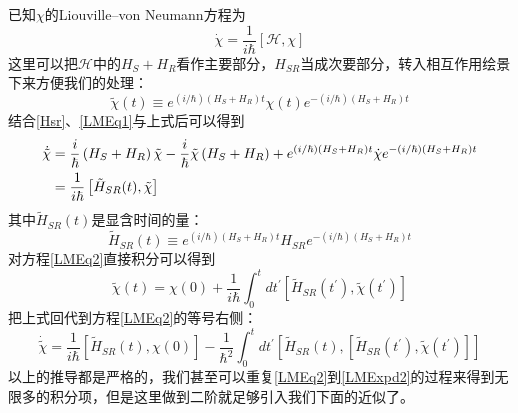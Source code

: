 已知$\chi$的Liouville--von Neumann方程为
\begin{equation}
\dot{\chi}=\frac{1}{i \hbar}[\mathcal{H}, \chi]
\label{LMEq1}
\end{equation}
这里可以把$\mathcal{H}$中的$H_{S}+H_{R}$看作主要部分，$H_{SR}$当成次要部分，转入相互作用绘景下来方便我们的处理：
\begin{equation}
\tilde{\chi}(t) \equiv e^{(i / \hbar)\left(H_{S}+H_{R}\right) t} \chi(t) e^{-(i / \hbar)\left(H_{S}+H_{R}\right) t}
\end{equation}
结合\eqref{Hsr}、\eqref{LMEq1}与上式后可以得到
\begin{align}
\dot{\tilde{\chi}} &=\frac{i}{\hbar}\left(H_{S}+H_{R}\right) \tilde{\chi}-\frac{i}{\hbar} \tilde{\chi}\left(H_{S}+H_{R}\right)+e^{(i / \hbar)\left(H_{S}+H_{R}\right) t} \dot{\chi} e^{-(i / \hbar)\left(H_{S}+H_{R}\right) t} \notag \\
&=\frac{1}{i \hbar}\left[\tilde{H}_{S R}(t), \tilde{\chi}\right]
\label{LMEq2}
\end{align}
其中$\tilde{H}_{S R}(t)$是显含时间的量：
\begin{equation}
\tilde{H}_{S R}(t) \equiv e^{(i / \hbar)\left(H_{S}+H_{R}\right) t} H_{S R} e^{-(i / \hbar)\left(H_{S}+H_{R}\right) t}
\end{equation}
对方程\eqref{LMEq2}直接积分可以得到
\begin{equation}
\tilde{\chi}(t)=\chi(0)+\frac{1}{i \hbar} \int_{0}^{t} d t^{\prime}\left[\tilde{H}_{S R}\left(t^{\prime}\right), \tilde{\chi}\left(t^{\prime}\right)\right]
\end{equation}
把上式回代到方程\eqref{LMEq2}的等号右侧：
\begin{equation}
\dot{\tilde{\chi}}=\frac{1}{i \hbar}\left[\tilde{H}_{S R}(t), \chi(0)\right]-\frac{1}{\hbar^{2}} \int_{0}^{t} d t^{\prime}\left[\tilde{H}_{S R}(t),\left[\tilde{H}_{S R}\left(t^{\prime}\right), \tilde{\chi}\left(t^{\prime}\right)\right]\right]
\label{LMExpd2}
\end{equation}
以上的推导都是严格的，我们甚至可以重复\eqref{LMEq2}到\eqref{LMExpd2}的过程来得到无限多的积分项，但是这里做到二阶就足够引入我们下面的近似了。

